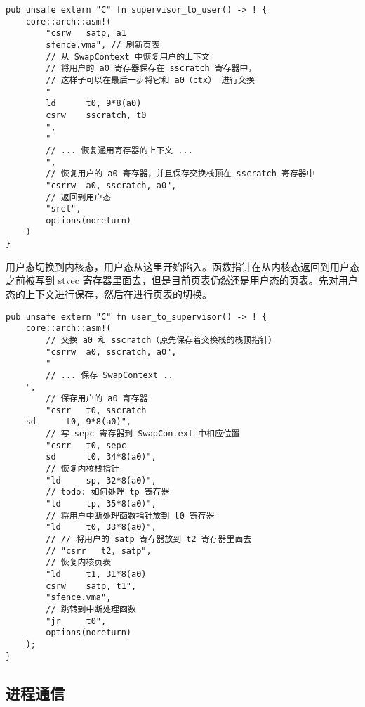 \begin{lstlisting}[caption=由内核态进入用户态]
pub unsafe extern "C" fn supervisor_to_user() -> ! {
    core::arch::asm!(
        "csrw   satp, a1
        sfence.vma", // 刷新页表
        // 从 SwapContext 中恢复用户的上下文
        // 将用户的 a0 寄存器保存在 sscratch 寄存器中，
        // 这样子可以在最后一步将它和 a0（ctx） 进行交换
        "
        ld      t0, 9*8(a0)
        csrw    sscratch, t0
        ",
        "
        // ... 恢复通用寄存器的上下文 ...
        ",
        // 恢复用户的 a0 寄存器，并且保存交换栈顶在 sscratch 寄存器中
        "csrrw  a0, sscratch, a0",
        // 返回到用户态
        "sret",
        options(noreturn)
    )
}

\end{lstlisting}


用户态切换到内核态，用户态从这里开始陷入。函数指针在从内核态返回到用户态之前被写到 stvec 寄存器里面去，但是目前页表仍然还是用户态的页表。先对用户态的上下文进行保存，然后在进行页表的切换。

\begin{lstlisting}[caption=由用户态进入内核态]
pub unsafe extern "C" fn user_to_supervisor() -> ! {
    core::arch::asm!(
        // 交换 a0 和 sscratch（原先保存着交换栈的栈顶指针）
        "csrrw  a0, sscratch, a0",
        "
        // ... 保存 SwapContext ..
    ",
        // 保存用户的 a0 寄存器
        "csrr   t0, sscratch
    sd      t0, 9*8(a0)",
        // 写 sepc 寄存器到 SwapContext 中相应位置
        "csrr   t0, sepc
        sd      t0, 34*8(a0)",
        // 恢复内核栈指针
        "ld     sp, 32*8(a0)",
        // todo: 如何处理 tp 寄存器
        "ld     tp, 35*8(a0)",
        // 将用户中断处理函数指针放到 t0 寄存器
        "ld     t0, 33*8(a0)",
        // // 将用户的 satp 寄存器放到 t2 寄存器里面去
        // "csrr   t2, satp",
        // 恢复内核页表
        "ld     t1, 31*8(a0)
        csrw    satp, t1",
        "sfence.vma",
        // 跳转到中断处理函数
        "jr     t0",
        options(noreturn)
    );
}
\end{lstlisting}

\subsection{进程通信}


